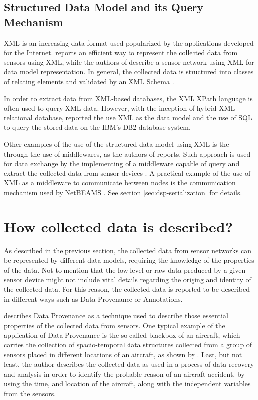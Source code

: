 \subsection{Structured Data Model and its Query Mechanism}

XML is an increasing data format used popularized by the applications developed
for the Internet. \cite{sn-xml-usage01} reports an efficient way to represent
the collected data from sensors using XML, while the authors of
\cite{sn-xml-usage02} describe a sensor network using XML for data model
representation. In general, the collected data is structured into classes of
relating elements and validated by an XML Schema \cite{xml-schema}.

In order to extract data from XML-based databases, the XML XPath language
\cite{xml-xpath} is often used to query XML data. However, with the inception
of hybrid XML-relational database, \cite{sn-xml-usage03} reported the use XML
as the data model and the use of SQL to query the stored data on the IBM's DB2
database system. 

Other examples of the use of the structured data model using XML is the through
the use of middlewares, as the authors of \cite{sn-xml-query-engines} reports.
Such approach is used for data exchange by the implementing of a middleware
capable of query and extract the collected data from sensor devices
\cite{sn-xml-middleware}. A practical example of the use of XML as a middleware
to communicate between nodes is the communication mechanism used by NetBEAMS
\cite{netbeams2009}. See section \ref{sec:dsp-serialization} for details.

\section{How collected data is described?}
\label{sec:sn-data-description}

As described in the previous section, the collected data from sensor networks
can be represented by different data models, requiring the knowledge of the
properties of the data. Not to mention that the low-level or raw data produced
by a given sensor device might not include vital details regarding the
origing and identity of the collected data. For this reason, the collected data
is reported to be described in different ways such as Data Provenance or
Annotations.

\cite{sn-provenance} describes Data Provenance as a technique used to describe
those essential properties of the collected data from sensors. One typical
example of the application of Data Provenance is the so-called blackbox of an
aircraft, which carries the collection of spacio-temporal data structures
collected from a group of sensors placed in different locations of an
aircraft, as shown by \cite{sn-exemple-blackbox}. Last, but not least, the
author describes the collected data as used in a process of data recovery and
analysis in order to identify the probable reason of an aircraft accident, by
using the time, and location of the aircraft, along with the independent
variables from the sensors.

